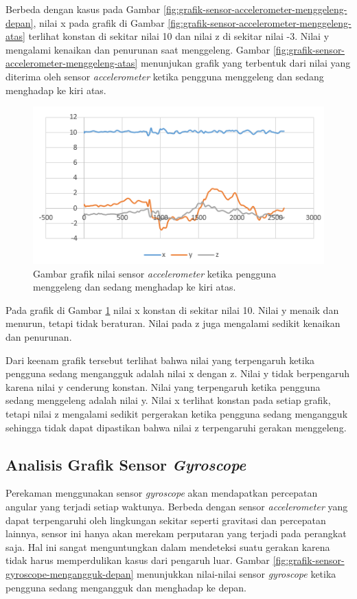 Berbeda dengan kasus pada Gambar \ref{fig:grafik-sensor-accelerometer-menggeleng-depan}, nilai x pada grafik di Gambar \ref{fig:grafik-sensor-accelerometer-menggeleng-atas} terlihat konstan di sekitar nilai 10 dan nilai z di sekitar nilai -3. Nilai y mengalami kenaikan dan penurunan saat menggeleng. Gambar \ref{fig:grafik-sensor-accelerometer-menggeleng-atas} menunjukan grafik yang terbentuk dari nilai yang diterima oleh sensor \textit{accelerometer} ketika pengguna menggeleng dan sedang menghadap ke kiri atas.

\begin{figure}[htbp]
\centering
\includegraphics[scale=1]{Gambar/grafik-sensor-accelerometer-menggeleng-kiri-atas.png}
\caption{Gambar grafik nilai sensor \textit{accelerometer} ketika pengguna menggeleng dan sedang menghadap ke kiri atas.} 
\label{fig:grafik-sensor-accelerometer-menggeleng-kiri-atas}
\end{figure}

Pada grafik di Gambar \ref{fig:grafik-sensor-accelerometer-menggeleng-kiri-atas} nilai x konstan di sekitar nilai 10. Nilai y menaik dan menurun, tetapi tidak beraturan. Nilai pada z juga mengalami sedikit kenaikan dan penurunan. 

Dari keenam grafik tersebut terlihat bahwa nilai yang terpengaruh ketika pengguna sedang mengangguk adalah nilai x dengan z. Nilai y tidak berpengaruh karena nilai y cenderung konstan. Nilai yang terpengaruh ketika pengguna sedang menggeleng adalah nilai y. Nilai x terlihat konstan pada setiap grafik, tetapi nilai z mengalami sedikit pergerakan ketika pengguna sedang mengangguk sehingga tidak dapat dipastikan bahwa nilai z terpengaruhi gerakan menggeleng. 

\subsection{Analisis Grafik Sensor \textit{Gyroscope}}
\label{sec:analisis_grafik_sensor_gyroscope}
Perekaman menggunakan sensor \textit{gyroscope} akan mendapatkan percepatan angular yang terjadi setiap waktunya. Berbeda dengan sensor \textit{accelerometer} yang dapat terpengaruhi oleh lingkungan sekitar seperti gravitasi dan percepatan lainnya, sensor ini hanya akan merekam perputaran yang terjadi pada perangkat saja. Hal ini sangat menguntungkan dalam mendeteksi suatu gerakan karena tidak harus memperdulikan kasus dari pengaruh luar. Gambar \ref{fig:grafik-sensor-gyroscope-mengangguk-depan} menunjukkan nilai-nilai sensor \textit{gyroscope} ketika pengguna sedang mengangguk dan menghadap ke depan.


